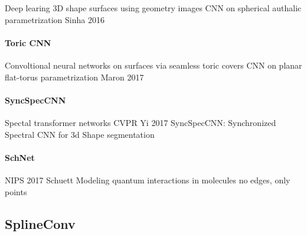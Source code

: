 \documentclass[pdftex,10pt,a4paper]{scrartcl}
\begin{document}
Deep learing 3D shape surfaces using geometry images
CNN on spherical authalic parametrization
Sinha 2016

\paragraph{Toric CNN}

Convoltional neural networks on surfaces via seamless toric covers
CNN on planar flat-torus parametrization
Maron 2017

\paragraph{SyncSpecCNN}

Spectal transformer networks
CVPR
Yi 2017
SyncSpecCNN: Synchronized Spectral CNN for 3d Shape segmentation

\paragraph{SchNet}

NIPS 2017
Schuett
Modeling quantum interactions in molecules
no edges, only points

\subsection{SplineConv}



\end{document}
